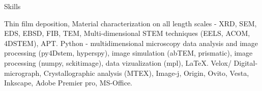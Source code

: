 
\begin{rubric}{Skills}

	Thin film deposition, Material characterization on all length scales - XRD, SEM, EDS, EBSD, FIB, TEM, Multi-dimensional STEM techniques (EELS, ACOM, 4DSTEM), APT.
	Python - multidimensional microscopy data analysis and image processing (py4Dstem, hyperspy), image simulation (abTEM, prismatic), image processing (numpy, sckitimage), data vizualization (mpl), \LaTeX.
    Velox/ Digital-micrograph,	Crystallographic analysis (MTEX), Image-j, Origin, Ovito, Vesta, Inkscape, Adobe Premier pro, MS-Office.

\end{rubric}
